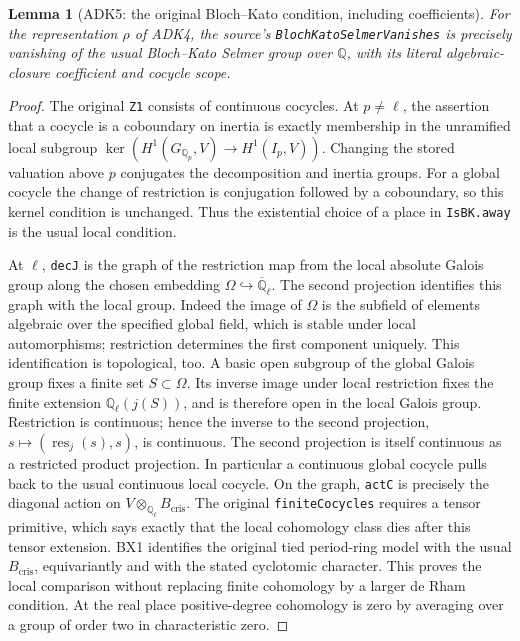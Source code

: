 \documentclass[11pt,a4paper]{article}
\numberwithin{equation}{section}
\newtheorem{lemma}[theorem]{Lemma}
\theoremstyle{remark}\newtheorem{remark}[theorem]{Remark}
\begin{document}
\begin{lemma}[ADK5: the original Bloch--Kato condition, including coefficients]
\label{claim:ADK5}
For the representation $\rho$ of ADK4, the source's
\texttt{Bloch\allowbreak Kato\allowbreak Selmer\allowbreak Vanishes} is precisely vanishing of the usual
Bloch--Kato Selmer group over $\mathbb Q$, with its literal
algebraic-closure coefficient and cocycle scope.
\end{lemma}
\begin{proof}
The original \texttt{Z1} consists of continuous cocycles.  At
$p\ne\ell$, the assertion that a cocycle is a coboundary on inertia
is exactly membership in the unramified local subgroup
$\ker(H^1(G_{\mathbb Q_p},\allowbreak{} V)\to H^1(I_p,\allowbreak{} V))$.
Changing the stored valuation above $p$ conjugates the decomposition
and inertia groups.  For a global cocycle the change of restriction
is conjugation followed by a coboundary, so this kernel condition is
unchanged.  Thus the existential choice of a place in
\texttt{Is\allowbreak BK.\allowbreak away} is the usual local condition.

At $\ell$, \texttt{dec\allowbreak J} is the graph of the restriction map from
the local absolute Galois group along the chosen embedding
$\Omega\hookrightarrow\overline{\mathbb Q}_\ell$.  The second
projection identifies this graph with the local group.  Indeed the
image of $\Omega$ is the subfield of elements algebraic over the
specified global field, which is stable under local automorphisms;
restriction determines the first component uniquely.  This
identification is topological, too.  A basic open subgroup of the
global Galois group fixes a finite set $S\subset\Omega$.
Its inverse image under local restriction fixes the finite extension
$\mathbb Q_\ell(j(S))$, and is therefore open in the local Galois
group.  Restriction is continuous; hence the inverse to the second
projection, $s\mapsto(\operatorname{res}_j(s),\allowbreak{} s)$, is continuous.
The second projection is itself continuous as a restricted product
projection.  In particular a continuous global cocycle pulls back
to the usual continuous local cocycle.  On the graph,
\texttt{act\allowbreak C} is precisely the diagonal action on
$V\otimes_{\mathbb Q_\ell}B_{\mathrm{cris}}$.
The original \texttt{finite\allowbreak Cocycles} requires a tensor primitive,
which says exactly that the local cohomology class dies after this
tensor extension.  BX1 identifies the original tied period-ring
model with the usual $B_{\mathrm{cris}}$, equivariantly and with
the stated cyclotomic character.  This proves the local comparison
without replacing finite cohomology by a larger de Rham condition.
At the real place positive-degree cohomology is zero by averaging
over a group of order two in characteristic zero.


\end{proof}
\end{document}
